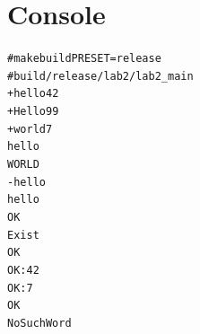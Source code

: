 



\pagebreak

\section{Console}

\begin{alltt}
# make build PRESET=release
# build/release/lab2/lab2_main
+ hello 42
+ Hello 99
+ world 7
hello
WORLD
- hello
hello
OK
Exist
OK
OK: 42
OK: 7
OK
NoSuchWord
\end{alltt}

\pagebreak

